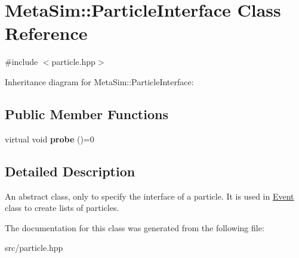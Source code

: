 \hypertarget{classMetaSim_1_1ParticleInterface}{}\section{Meta\+Sim\+:\+:Particle\+Interface Class Reference}
\label{classMetaSim_1_1ParticleInterface}


{\ttfamily \#include $<$particle.\+hpp$>$}



Inheritance diagram for Meta\+Sim\+:\+:Particle\+Interface\+:
\subsection*{Public Member Functions}
\begin{DoxyCompactItemize}
\item 
virtual void {\bfseries probe} ()=0\hypertarget{classMetaSim_1_1ParticleInterface_a1678e7f99f0cde6d29dc81349147ec5a}{}\label{classMetaSim_1_1ParticleInterface_a1678e7f99f0cde6d29dc81349147ec5a}

\end{DoxyCompactItemize}


\subsection{Detailed Description}
An abstract class, only to specify the interface of a particle. It is used in \hyperlink{classMetaSim_1_1Event}{Event} class to create lists of particles. 

The documentation for this class was generated from the following file\+:\begin{DoxyCompactItemize}
\item 
src/particle.\+hpp\end{DoxyCompactItemize}
